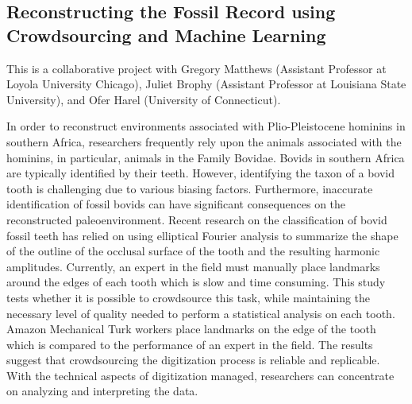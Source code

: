 \subsection{Reconstructing the Fossil Record using Crowdsourcing and Machine Learning}

This is a collaborative project with Gregory Matthews (Assistant Professor at Loyola University Chicago), Juliet Brophy (Assistant Professor at Louisiana State University), and Ofer Harel (University of Connecticut).
\vspace{5pt}

In order to reconstruct environments associated with Plio-Pleistocene hominins in southern Africa, researchers frequently rely upon the animals associated with the hominins, in particular, animals in the Family Bovidae. Bovids in southern Africa are typically identified by their teeth. However, identifying the taxon of a bovid tooth is challenging due to various biasing factors. Furthermore, inaccurate identification of fossil bovids can have significant consequences on the reconstructed paleoenvironment. Recent research on the classification of bovid fossil teeth has relied on using elliptical Fourier analysis to summarize the shape of the outline of the occlusal surface of the tooth and the resulting harmonic amplitudes. Currently, an expert in the field must manually place landmarks around the edges of each tooth which is slow and time consuming. This study tests whether it is possible to crowdsource this task, while maintaining the necessary level of quality needed to perform a statistical analysis on each tooth. Amazon Mechanical Turk workers place landmarks on the edge of the tooth which is compared to the performance of an expert in the field. The results suggest that crowdsourcing the digitization process is reliable and replicable. With the technical aspects of digitization managed, researchers can concentrate on analyzing and interpreting the data.

\begin{refsection}
    \nocite{g._j._matthews_comparison_2018}
    \nocite{juliet_k._brophy_quantitative_2015}
    \nocite{gregory_j._matthews_examining_2017}
    \printbibliography[heading=none]
\end{refsection}
